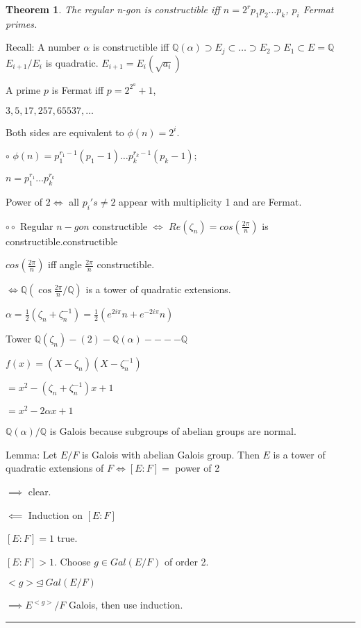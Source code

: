 \documentclass[twoside]{article}
\newcounter{lecnum}
\newcommand{\Q}{\mathbb{Q}}
\newcommand{\z}{\zeta}
\newcommand{\al}{\alpha}
\newtheorem{theorem}{Theorem}[lecnum]
\newenvironment{proof}{{\bf Proof:}}{\hfill\rule{2mm}{2mm}}
\begin{document}
\begin{theorem}
    The regular n-gon is constructible iff $n = 2^rp_1p_2\dots p_k$, $p_i$ Fermat primes. 
\end{theorem}

Recall: A number $\al$ is constructible iff $\Q(\alpha) \supset E_j \subset \dots \supset E_2 \supset E_1 \subset E = \Q$
$E_{i+1}/E_i$ is quadratic. $E_{i+1} = E_i(\sqrt{a_i})$

A prime $p$ is Fermat iff $p = 2^{2^a} + 1$, 

$3,5,17,257, 65537, \dots$


\begin{proof}
    Both sides are equivalent to $\phi(n) =2^i$. 

    $\circ$ $\phi(n) = p_1^{r_1-1}(p_1 -1) \dots p_k^{r_k-1}(p_k - 1)$; 

    $n = p_1^{r_1}\dots p_k^{r_k}$

    Power of $2 \iff$ all $p_i's \neq 2$ appear with multiplicity 1 and are Fermat.

    $\circ\circ$ Regular $n-gon$ constructible $\iff$ $Re(\z_n) = cos(\frac{2\pi}{n})$ is constructible.constructible

    $cos(\frac{2\pi}{n})$ iff angle $\frac{2\pi}{n}$ constructible. 

    $\iff \Q(\cos\frac{2\pi}{n}/\Q)$ is a tower of quadratic extensions. 

    $\alpha = \frac12 (\zeta_n + \zeta_n^{-1}) = \frac12 (e^{2i\pi}{n} + e^{-2i\pi}{n})$

    Tower $\Q(\z_n) -(2)- \Q(\alpha) ---- \Q$

    $f(x) = (X - \zeta_n)(X - \zeta_n^{-1})$

    $=x^2 - (\z_n + \z_n^{-1})x + 1$

    $= x^2 - 2\alpha x + 1$


    $\Q(\al)/\Q$ is Galois because subgroups of abelian groups are normal. 

    Lemma: Let $E/F$ is Galois with abelian Galois group. Then $E$ is a tower of quadratic extensions of $F \iff [E:F] = $ power of 2
    
    $\implies$ clear. 

    $\impliedby$ Induction on $[E:F]$ 

    $[E:F] = 1$ true.

    $[E:F] > 1$. Choose $g \in Gal(E/F)$ of order 2. 

    $<g> \unlhd \ Gal(E/F)$

    $\implies E^{<g>}/F$ Galois, then use induction.
\end{proof}
\end{document}
